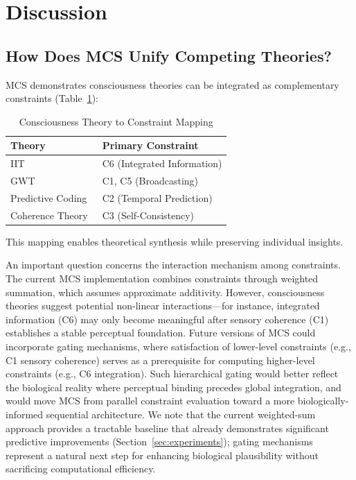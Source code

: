 \documentclass[10pt,journal,compsoc]{IEEEtran}
\begin{document}
\section{Discussion}
\label{sec:discussion}

\subsection{How Does MCS Unify Competing Theories?}

MCS demonstrates consciousness theories can be integrated as complementary constraints (Table~\ref{tab:theory_mapping}):

\begin{table}[!t]
\renewcommand{\arraystretch}{1.3}
\caption{Consciousness Theory to Constraint Mapping}
\label{tab:theory_mapping}
\centering
\begin{tabular}{ll}
\toprule
\textbf{Theory} & \textbf{Primary Constraint} \\
\midrule
IIT~\cite{tononi2004,tononi2008,tononi2016} & C6 (Integrated Information) \\
GWT~\cite{baars2005,dehaene2011} & C1, C5 (Broadcasting) \\
Predictive Coding~\cite{friston2010} & C2 (Temporal Prediction) \\
Coherence Theory~\cite{thagard1998} & C3 (Self-Consistency) \\
\bottomrule
\end{tabular}
\end{table}

This mapping enables theoretical synthesis while preserving individual insights.

An important question concerns the interaction mechanism among constraints. The current MCS implementation combines constraints through weighted summation, which assumes approximate additivity. However, consciousness theories suggest potential non-linear interactions—for instance, integrated information (C6) may only become meaningful after sensory coherence (C1) establishes a stable perceptual foundation. Future versions of MCS could incorporate gating mechanisms, where satisfaction of lower-level constraints (e.g., C1 sensory coherence) serves as a prerequisite for computing higher-level constraints (e.g., C6 integration). Such hierarchical gating would better reflect the biological reality where perceptual binding precedes global integration, and would move MCS from parallel constraint evaluation toward a more biologically-informed sequential architecture. We note that the current weighted-sum approach provides a tractable baseline that already demonstrates significant predictive improvements (Section~\ref{sec:experiments}); gating mechanisms represent a natural next step for enhancing biological plausibility without sacrificing computational efficiency.
\end{document}
